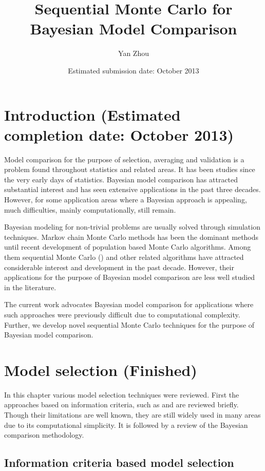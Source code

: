 \documentclass[11pt, fontset=Minion, showoverfull, toclevel=2,
bib, biblatexstyle=numeric, mintcode, minted=cache]{marticle}
\title{Sequential Monte Carlo for Bayesian Model Comparison}
\author{Yan Zhou}
\date{Estimated submission date: October 2013}
\def\finish#1{(Estimated completion date: #1 2013)}
\begin{document}
\maketitle

\section{Introduction \finish{October}}

Model comparison for the purpose of selection, averaging and validation is a
problem found throughout statistics and related areas. It has been studies
since the very early days of statistics. Bayesian model comparison has
attracted substantial interest and has seen extensive applications in the past
three decades. However, for some application areas where a Bayesian approach
is appealing, much difficulties, mainly computationally, still remain.

Bayesian modeling for non-trivial problems are usually solved through
simulation techniques. Markov chain Monte Carlo methods has been the dominant
methods until recent development of population based Monte Carlo algorithms.
Among them sequential Monte Carlo (\smc) and other related algorithms have
attracted considerable interest and development in the past decade. However,
their applications for the purpose of Bayesian model comparison are less well
studied in the literature.

The current work advocates Bayesian model comparison for applications where
such approaches were previously difficult due to computational complexity.
Further, we develop novel sequential Monte Carlo techniques for the purpose of
Bayesian model comparison.

\section{Model selection (Finished)}

In this chapter various model selection techniques were reviewed. First the
approaches based on information criteria, such as \aic and \bic are reviewed
briefly. Though their limitations are well known, they are still widely used
in many areas due to its computational simplicity. It is followed by a review
of the Bayesian comparison methodology.

\subsection{Information criteria based model selection}
\end{document}
